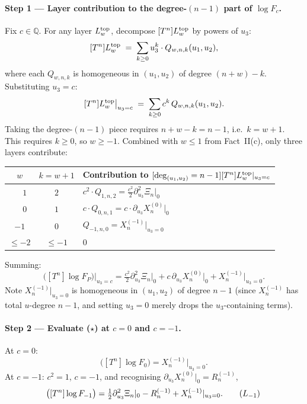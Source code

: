 \documentclass[11pt]{amsart}
\newcommand{\FP}{F_P}
\newcommand{\Rminus}{R^{(-1)}}
\newcommand{\Xtop}{X^{(0)}}
\newcommand{\Xminus}{X^{(-1)}}
\newcommand{\deghom}[1]{[\deg_{(u_1,u_2)} = #1]}
\begin{document}
\paragraph{Step 1 --- Layer contribution to the degree-$(n-1)$ part of $\log F_c$.}
Fix $c \in \mathbb Q$. For any layer $L^{\rm top}_w$, decompose $[T^n]
L^{\rm top}_w$ by powers of $u_3$:
\[
[T^n] L^{\rm top}_w \;=\; \sum_{k \ge 0} u_3^k \cdot Q_{w, n, k}(u_1, u_2),
\]
where each $Q_{w, n, k}$ is homogeneous in $(u_1, u_2)$ of degree $(n+w) - k$.
Substituting $u_3 = c$:
\[
[T^n] L^{\rm top}_w \big|_{u_3 = c} \;=\; \sum_{k \ge 0} c^k \, Q_{w, n, k}(u_1, u_2).
\]
Taking the degree-$(n-1)$ piece requires $n + w - k = n - 1$, i.e.\ $k = w + 1$.
This requires $k \ge 0$, so $w \ge -1$. Combined with $w \le 1$ from
Fact~II(c), only three layers contribute:
\begin{center}
\begin{tabular}{c|c|l}
$w$ & $k = w+1$ & Contribution to $\deghom{n-1}[T^n] L^{\rm top}_w|_{u_3 = c}$ \\ \hline
$\phantom{-}1$ & $2$ & $c^2 \cdot Q_{1, n, 2} = \tfrac{c^2}{2}\partial_{u_3}^2 \Xi_n|_0$ \\
$\phantom{-}0$ & $1$ & $c \cdot Q_{0, n, 1} = c \cdot \partial_{u_3} \Xtop_n|_0$ \\
$-1$ & $0$ & $Q_{-1, n, 0} = \Xminus_n|_{u_3 = 0}$ \\
$\le -2$ & $\le -1$ & $0$ \\
\end{tabular}
\end{center}
Summing:
\begin{equation}
\deghom{n-1}\!\bigl([T^n]\log \FP\bigr)\big|_{u_3 = c} =
\tfrac{c^2}{2} \partial_{u_3}^2 \Xi_n\big|_0
+ c \, \partial_{u_3} \Xtop_n\big|_0
+ \Xminus_n\big|_{u_3 = 0}. \tag{$\star$}
\end{equation}
Note $\Xminus_n|_{u_3 = 0}$ is homogeneous in $(u_1, u_2)$ of degree $n-1$
(since $\Xminus_n$ has total $u$-degree $n-1$, and setting $u_3 = 0$
merely drops the $u_3$-containing terms).

\paragraph{Step 2 --- Evaluate ($\star$) at $c = 0$ and $c = -1$.}
At $c = 0$:
\begin{equation}
\deghom{n-1}\!\bigl([T^n] \log F_0\bigr) = \Xminus_n\big|_{u_3 = 0}. \tag{$L_0$}
\end{equation}
At $c = -1$: $c^2 = 1$, $c = -1$, and recognising $\partial_{u_3}\Xtop_n|_0 = \Rminus_n$,
\begin{equation}
\deghom{n-1}\!\bigl([T^n] \log F_{-1}\bigr) =
\tfrac{1}{2}\partial_{u_3}^2 \Xi_n|_0 - \Rminus_n + \Xminus_n|_{u_3=0}. \tag{$L_{-1}$}
\end{equation}
\end{document}
